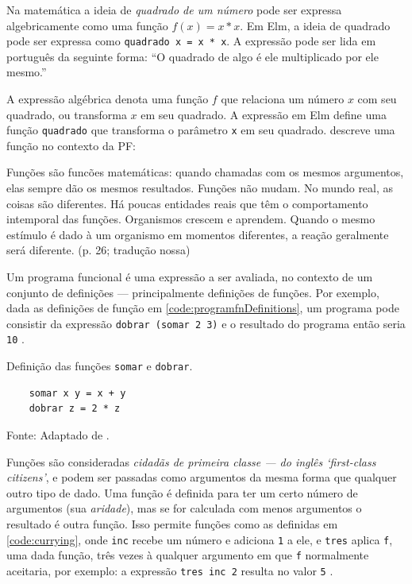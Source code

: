 Na matemática a ideia de \emph{quadrado de um número} pode ser expressa
algebricamente como uma função \(f(x)=x*x\).
Em Elm, a ideia de quadrado pode ser expressa como \texttt{quadrado x = x * x}.
A expressão pode ser lida em português da seguinte forma: “O quadrado de algo
é ele multiplicado por ele mesmo.”

A expressão algébrica denota uma função \(f\) que relaciona um número \(x\) com
seu quadrado, ou transforma \(x\) em seu quadrado.
A expressão em Elm define uma função \texttt{quadrado} que transforma o
parâmetro \texttt{x} em seu quadrado.
\textcite{roy2009} descreve uma função no contexto da PF:

\begin{citacao}
  Funções são funcões matemáticas: quando chamadas com os mesmos argumentos,
  elas sempre dão os mesmos resultados. Funções não mudam. No mundo real,
  as coisas são diferentes. Há poucas entidades reais que têm o comportamento
  intemporal das funções. Organismos crescem e aprendem. Quando o mesmo
  estímulo é dado à um organismo em momentos diferentes, a reação geralmente
  será diferente. (p. 26; tradução nossa)
\end{citacao}

Um programa funcional é uma expressão a ser avaliada, no contexto de um
conjunto de definições — principalmente definições de funções.
Por exemplo, dada as definições de função em \ref{code:programfnDefinitions}, um
programa pode consistir da expressão \texttt{dobrar (somar 2 3)} e o resultado
do programa então seria \texttt{10} \cite{noble1994}.

\begin{listing}[H]
  \centering
  \caption{Definição das funções \texttt{somar} e \texttt{dobrar}.}
  \begin{verbatim}
    somar x y = x + y
    dobrar z = 2 * z
  \end{verbatim}
  \small Fonte: Adaptado de \textcite{noble1994}.
  \label{code:programfnDefinitions}
\end{listing}

Funções são consideradas \emph{cidadãs de primeira classe — do inglês ‘first-class
citizens’}, e podem ser passadas como argumentos da mesma forma que qualquer
outro tipo de dado.
Uma função é definida para ter um certo número de argumentos (sua \emph{aridade}),
mas se for calculada com menos argumentos o resultado é outra função.
Isso permite funções como as definidas em \ref{code:currying}, onde \texttt{inc} recebe
um número e adiciona \texttt{1} a ele, e \texttt{tres} aplica \texttt{f}, uma dada função, três
vezes à qualquer argumento em que \texttt{f} normalmente aceitaria, por exemplo: a
expressão \texttt{tres inc 2} resulta no valor \texttt{5} \cite{noble1994}.

